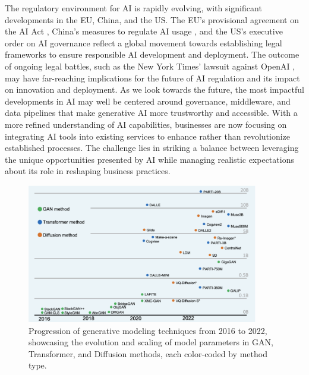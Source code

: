 \documentclass[11pt,a4paper,oneside]{report}
\begin{document}
The regulatory environment for AI is rapidly evolving, with significant developments in the EU, China, and the US. 
The EU's provisional agreement on the AI Act \cite{eu_ai_act_2023}, China's measures to regulate AI usage \cite{China_AI_Policy_2023}, and the US's executive order on AI governance \cite{WhiteHouse_AI_ExecOrder_2023} reflect a global movement towards establishing legal frameworks to ensure responsible AI development and deployment. 
The outcome of ongoing legal battles, such as the New York Times' lawsuit against OpenAI \cite{Grynbaum_Mac_2023_Times_Sues_OpenAI}, may have far-reaching implications for the future of AI regulation and its impact on innovation and deployment. 
As we look towards the future, the most impactful developments in AI may well be centered around governance, middleware, and data pipelines that make generative AI more trustworthy and accessible. 
With a more refined understanding of AI capabilities, businesses are now focusing on integrating AI tools into existing services to enhance rather than revolutionize established processes. 
The challenge lies in striking a balance between leveraging the unique opportunities presented by AI while managing realistic expectations about its role in reshaping business practices.

\begin{figure}[htbp]
  \centering
  \includegraphics[width=0.9\textwidth]{models.png}
  \caption{Progression of generative modeling techniques from 2016 to 2022, showcasing the evolution and scaling of model parameters in GAN, Transformer, and Diffusion methods, each color-coded by method type.\cite{bie2023renaissance}}
\end{figure}
\end{document}
